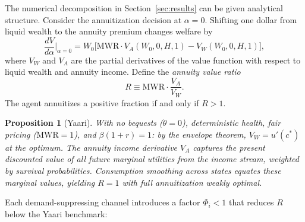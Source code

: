 \documentclass[12pt]{article}
\newtheorem{proposition}{Proposition}
\begin{document}
The numerical decomposition in Section~\ref{sec:results} can be given analytical structure. Consider the annuitization decision at $\alpha = 0$. Shifting one dollar from liquid wealth to the annuity premium changes welfare by
\begin{equation}
\label{eq:annuity_value_ratio}
\frac{dV}{d\alpha}\bigg|_{\alpha=0} = W_0 \Big[\text{MWR} \cdot V_A(W_0, 0, H, 1) - V_W(W_0, 0, H, 1)\Big],
\end{equation}
where $V_W$ and $V_A$ are the partial derivatives of the value function with respect to liquid wealth and annuity income. Define the \textit{annuity value ratio}
\begin{equation}
\label{eq:R_ratio}
R \equiv \text{MWR} \cdot \frac{V_A}{V_W}.
\end{equation}
The agent annuitizes a positive fraction if and only if $R > 1$.

\begin{proposition}[Yaari]
With no bequests ($\theta = 0$), deterministic health, fair pricing ($\text{MWR} = 1$), and $\beta(1+r) = 1$: by the envelope theorem, $V_W = u'(c^*)$ at the optimum. The annuity income derivative $V_A$ captures the present discounted value of all future marginal utilities from the income stream, weighted by survival probabilities. Consumption smoothing across states equates these marginal values, yielding $R = 1$ with full annuitization weakly optimal.
\end{proposition}

Each demand-suppressing channel introduces a factor $\Phi_i < 1$ that reduces $R$ below the Yaari benchmark:
\end{document}
